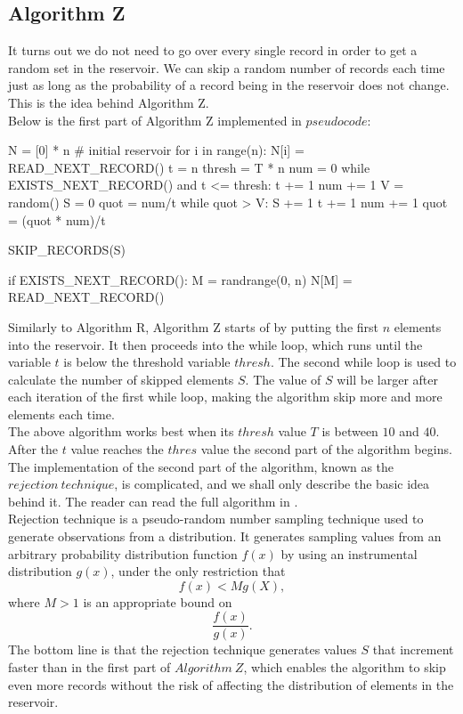 \documentclass[journal]{IEEEtran/IEEEtran}
\begin{document}
\subsection{Algorithm Z}
It turns out we do not need to go over every single record in order to get a random set in the reservoir. We can skip a random number of records each time just as long as the probability of a record being in the reservoir does not change. This is the idea behind Algorithm Z.\\

Below is the first part of Algorithm Z implemented in $pseudocode$:\\
\begin{code}
N = [0] * n # initial reservoir
for i in range(n):
  N[i] = READ_NEXT_RECORD()
t = n
thresh = T * n
num = 0
while EXISTS_NEXT_RECORD() and t <= thresh:
  t += 1
  num += 1
  V = random()
  S = 0
  quot = num/t
  while quot > V:
    S += 1
    t += 1
    num += 1
    quot = (quot * num)/t
	
    SKIP_RECORDS(S)
	
    if EXISTS_NEXT_RECORD():
      M = randrange(0, n)
      N[M] = READ_NEXT_RECORD()
		
\end{code}
Similarly to Algorithm R, Algorithm Z starts of by putting the first $n$ elements into the reservoir. It then proceeds into the while loop, which runs until the variable $t$ is below the threshold variable $thresh$. The second while loop is used to calculate the number of skipped elements $S$. The value of $S$ will be larger after each iteration of the first while loop, making the algorithm skip more and more elements each time.\\

The above algorithm works best when its $thresh$ value $T$ is between $10$ and $40$. After the $t$ value reaches the $thres$ value the second part of the algorithm begins. The implementation of the second part of the algorithm, known as the $rejection\ technique$, is complicated, and we shall only describe the basic idea behind it. The reader can read the full algorithm in \cite{reservoir85}.\\

Rejection technique is a pseudo-random number sampling technique used to generate observations from a distribution. It generates sampling values from an arbitrary probability distribution function $f(x)$ by using an instrumental distribution $g(x)$, under the only restriction that $$f(x) < Mg(X),$$where $M > 1$ is an appropriate bound on $$\frac{f(x)}{g(x)}.$$
The bottom line is that the rejection technique generates values $S$ that increment faster than in the first part of $Algorithm\ Z$, which enables the algorithm to skip even more records without the risk of affecting the distribution of elements in the reservoir.
\end{document}
